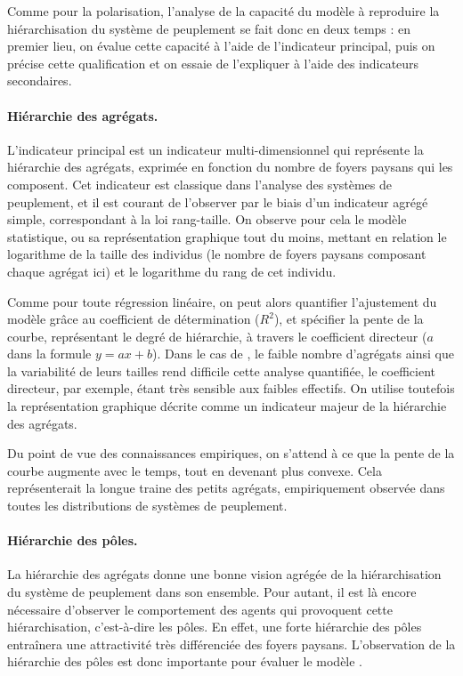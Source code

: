 Comme pour la polarisation, l'analyse de la capacité du modèle à reproduire la hiérarchisation du système de peuplement se fait donc en deux temps :
en premier lieu, on évalue cette capacité à l'aide de l'indicateur principal, puis on précise cette qualification et on essaie de l'expliquer à l'aide des indicateurs secondaires.

\paragraph{Hiérarchie des agrégats.}

L'indicateur principal est un indicateur multi-dimensionnel qui représente la hiérarchie des agrégats, exprimée en fonction du nombre de foyers paysans qui les composent.
Cet indicateur est classique dans l'analyse des systèmes de peuplement, et il est courant de l'observer par le biais d'un indicateur agrégé simple, correspondant à la loi rang-taille.
On observe pour cela le modèle statistique, ou sa représentation graphique tout du moins, mettant en relation le logarithme de la taille des individus (le nombre de foyers paysans composant chaque agrégat ici) et le logarithme du rang de cet individu.

Comme pour toute régression linéaire, on peut alors quantifier l'ajustement du modèle grâce au coefficient de détermination ($R^2$), et spécifier la pente de la courbe, représentant le degré de hiérarchie, à travers le coefficient directeur ($a$ dans la formule $y = ax + b$).
Dans le cas de \simfeodal{}, le faible nombre d'agrégats ainsi que la variabilité de leurs tailles rend difficile cette analyse quantifiée, le coefficient directeur, par exemple, étant très sensible aux faibles effectifs.
On utilise toutefois la représentation graphique décrite comme un indicateur majeur de la hiérarchie des agrégats.

Du point de vue des connaissances empiriques, on s'attend à ce que la pente de la courbe augmente avec le temps, tout en devenant plus convexe.
Cela représenterait la \og longue traine\fg{} des petits agrégats, empiriquement observée dans toutes les distributions de systèmes de peuplement.

\paragraph{Hiérarchie des pôles.}

La hiérarchie des agrégats donne une bonne vision agrégée de la hiérarchisation du système de peuplement dans son ensemble.
Pour autant, il est là encore nécessaire d'observer le comportement des agents qui provoquent cette hiérarchisation, c'est-à-dire les pôles.
En effet, une forte hiérarchie des pôles entraînera une attractivité très différenciée des foyers paysans.
L'observation de la hiérarchie des pôles est donc importante pour évaluer le modèle \simfeodal{}.

